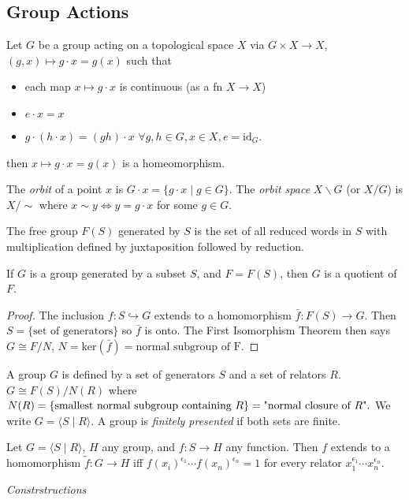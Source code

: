 \subsection{Group Actions}

Let $G$ be a group acting on a topological space $X$ via $G\times X\to X$,
$(g,x)\mapsto g\cdot x=g(x)$ such that
\begin{itemize}
\item each map $x\mapsto g\cdot x$ is continuous (as a fn $X\to X$)
\item $e\cdot x=x$
\item $g\cdot(h\cdot x)=(gh)\cdot x$ $\forall g,h\in G,x\in X,e=\text{id}_{G}$.
\end{itemize}
then $x\mapsto g\cdot x=g(x)$ is a homeomorphism.
\begin{defn}
The \emph{orbit} of a point $x$ is $G\cdot x=\{g\cdot x\mid g\in G\}$.
The \emph{orbit space} $X\backslash G$ (or $X/G$) is $X/\sim$ where
$x\sim y\Leftrightarrow y=g\cdot x$ for some $g\in G$.
\end{defn}

\begin{defn}
The free group $F(S)$ generated by $S$ is the set of all reduced
words in $S$ with multiplication defined by juxtaposition followed
by reduction.\end{defn}
\begin{prop}
If $G$ is a group generated by a subset $S$, and $F=F(S)$, then
$G$ is a quotient of $F$.\end{prop}
\begin{proof}
The inclusion $f:S\hookrightarrow G$ extends to a homomorphism $\bar{f}:F(S)\to G$.
Then $S=\{\text{set of generators}\}$ so $\bar{f}$ is onto. The
First Isomorphism Theorem then says $G\cong F/N$, $N=\text{ker}(\bar{f})=\text{normal subgroup of F}.$\end{proof}
\begin{defn}
A group $G$ is defined by a set of generators $S$ and a set of relators
$R$. $G\cong F(S)/N(R)$ where $N(R)=\{\text{smallest normal subgroup containing \ensuremath{R}}\}=\text{"normal closure of \ensuremath{R}"}.$
We write $G=\langle S\mid R\rangle$. A group is \emph{finitely presented}
if both sets are finite.\end{defn}
\begin{prop}
Let $G=\langle S\mid R\rangle$, $H$ any group, and $f:S\to H$ any
function. Then $f$ extends to a homomorphism $\tilde{f}:G\to H$
iff $f(x_{i})^{\epsilon_{1}}\cdots f(x_{n})^{\epsilon_{n}}=1$ for
every relator $x_{1}^{\epsilon_{1}}\cdots x_{n}^{\epsilon_{n}}$.
\end{prop}
\textit{\emph{Constrstructions}}

